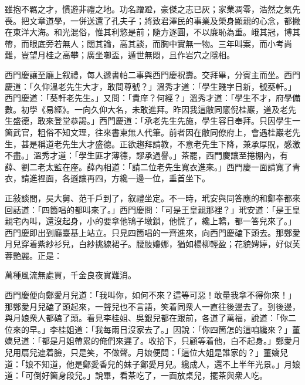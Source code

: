 \begin{myquote} 
雖抱不羈之才，慣遊非禮之地。功名蹭蹬，豪傑之志已灰；家業凋零，浩然之氣先䘮。把文章道學，一併送還了孔夫子；將致君澤民的事業及榮身顯親的心念，都撇在東洋大海。和光混俗，惟其利慾是前；隨方逐圓，不以廉恥為重。峨其冠，博其帶，而眼底旁若無人；闊其論，高其談，而胸中實無一物。三年叫案，而小考尚難，豈望月桂之高攀；廣坐啣盃，遁世無悶，且作岩穴之隱相。
\end{myquote} 

西門慶讓至廳上叙禮，每人遞書帕二事與西門慶祝壽。交拜畢，分賓主而坐。西門慶道：「久仰溫老先生大才，敢問尊號？」溫秀才道：「學生賤字日新，號葵軒。」西門慶道：「葵軒老先生。」又問：「貴庠？何經？」溫秀才道：「學生不才，府學備數。初學《易經》。{}一向久仰大名，未敢進拜。昨因我這敝同窻倪桂巖，道及老先生盛德，敢來登堂恭謁。」西門慶道：「承老先生先施，學生容日奉拜。只因學生一箇武官，粗俗不知文理，往來書柬無人代筆。前者因在敝同僚府上，會遇桂巖老先生，甚是稱道老先生大才盛德。正欲趨拜請教，不意老先生下降，兼承厚貺，感激不盡。」溫秀才道：「學生匪才薄德，謬承過譽。」茶罷，西門慶讓至捲棚內，有薛、劉二老太監在座。薛內相道：「請二位老先生寬衣進來。」西門慶一面請寬了青衣，請進裡面，各遜讓再四，方纔一邊一位，垂首坐下。

正敍談間，吳大舅、范千戶到了，叙禮坐定。不一時，玳安與同答應的和鄭奉都來回話道：「四箇唱的都叫來了。」西門慶問：「可是王皇親那裡？」玳安道：「是王皇親宅內叫，還沒起身，小的要拿他鴇子墩鎖，他慌了，纔上轎，都一答兒來了。」西門慶即出到廳臺基上站立。只見四箇唱的一齊進來，向西門慶磕下頭去。那鄭愛月兒穿着紫紗衫兒，白紗挑線裙子。腰肢嬝娜，猶如楊柳輕盈；花貌娉婷，好似芙蓉艷麗。正是：

\begin{myquote} 
萬種風流無處買，千金良夜實難消。
\end{myquote} 

西門慶便向鄭愛月兒道：「我叫你，如何不來？這等可惡！敢量我拿不得你來！」那鄭愛月兒磕了頭起來，一聲兒也不言語，笑着同衆人一直往後邊去了。{}到後邊，與月娘衆人都磕了頭。看見李桂姐、吳銀兒都在跟前，各道了萬福，說道：「你二位來的早。」李桂姐道：「我每兩日沒家去了。」因說：「你四箇怎的這咱纔來？」董嬌兒道：「都是月姐帶累的俺們來遲了。收拾下，只顧等着他，白不起身。」鄭愛月兒用扇兒遮着臉，只是笑，不做聲。月娘便問：「這位大姐是誰家的？」董嬌兒道：「娘不知道，他是鄭愛香兒的妹子鄭愛月兒。纔成人，還不上半年光景。」月娘道：「可倒好箇身段兒。」說畢，看茶吃了，一面放桌兒，擺茶與衆人吃。

